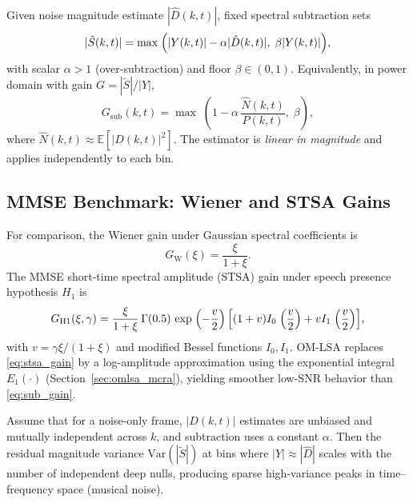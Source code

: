 Given noise magnitude estimate $|\hat{D}(k,t)|$, fixed spectral subtraction sets~\cite{boll1979}
\begin{equation}
  |\tilde{S}(k,t)| = \max\;\Bigl(|Y(k,t)| - \alpha|\hat{D}(k,t)|,\; \beta|Y(k,t)|\Bigr),
  \label{eq:fixed_sub_ch5}
\end{equation}
with scalar $\alpha>1$ (over-subtraction) and floor $\beta\in(0,1)$. Equivalently, in power domain with gain $G=|\tilde{S}|/|Y|$,
\begin{equation}
  G_{\mathrm{sub}}(k,t) = \max\;\left(1 - \alpha\,\frac{\hat{N}(k,t)}{P(k,t)},\; \beta\right),
  \label{eq:sub_gain}
\end{equation}
where $\hat{N}(k,t)\approx \mathbb{E}[|D(k,t)|^2]$. The estimator is \emph{linear in magnitude} and applies independently to each bin.

\subsection{MMSE Benchmark: Wiener and STSA Gains}

For comparison, the Wiener gain under Gaussian spectral coefficients is
\begin{equation}
  G_{\mathrm{W}}(\xi) = \frac{\xi}{1+\xi}.
  \label{eq:wiener_gain}
\end{equation}
The MMSE short-time spectral amplitude (STSA) gain under speech presence hypothesis $H_1$ is~\cite{ephraim1984}
\begin{equation}
  G_{\mathrm{H1}}(\xi,\gamma) = \frac{\xi}{1+\xi}\,\Gamma(0.5)\,\exp\;\Bigl(-\frac{v}{2}\Bigr)\,
  \Bigl[(1+v)I_0\;\Bigl(\frac{v}{2}\Bigr) + v I_1\;\Bigl(\frac{v}{2}\Bigr)\Bigr],
  \label{eq:stsa_gain}
\end{equation}
with $v=\gamma\xi/(1+\xi)$ and modified Bessel functions $I_0,I_1$. OM-LSA replaces \eqref{eq:stsa_gain} by a log-amplitude approximation using the exponential integral $E_1(\cdot)$ (Section~\ref{sec:omlsa_mcra}), yielding smoother low-SNR behavior than \eqref{eq:sub_gain}.

\begin{proposition}
\label{prop:musical_noise}
Assume that for a noise-only frame, $|D(k,t)|$ estimates are unbiased and mutually independent across $k$, and subtraction uses a constant $\alpha$. Then the residual magnitude variance $\mathrm{Var}(|\tilde{S}|)$ at bins where $|Y|\approx|\hat{D}|$ scales with the number of independent deep nulls, producing sparse high-variance peaks in time--frequency space (musical noise).
\end{proposition}

